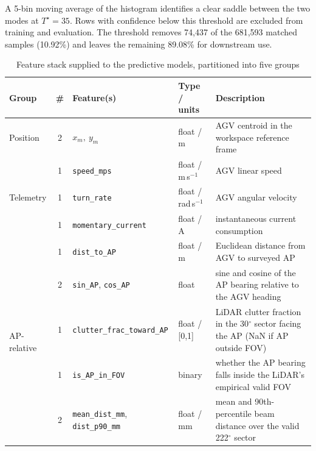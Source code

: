 \documentclass[conference]{IEEEtran}
\begin{document}
A 5-bin moving average of the histogram identifies a clear saddle between the two modes at $T^{\star} = 35$. Rows with confidence below this threshold are excluded from training and evaluation. The threshold removes 74{,}437 of the 681{,}593 matched samples (10.92\%) and leaves the remaining 89.08\% for downstream use.

\begin{table}[!t]
    \caption{Feature stack supplied to the predictive models, partitioned
    into five groups}
    \label{tab:features}
    \centering
    \setlength{\tabcolsep}{5pt}
    \footnotesize
    \begin{tabular}{l c p{} l p{}}
        \toprule
        Group & \# & Feature(s) & Type / units & Description \\
        \midrule
        Position             & 2  & $x_m,\ y_m$                              & float / m         & AGV centroid in the workspace reference frame \\
        \midrule
        \multirow{3}{*}{Telemetry} & 1 & \texttt{speed\_mps}              & float / m\,s$^{-1}$  & AGV linear speed \\
                             & 1  & \texttt{turn\_rate}                       & float / rad\,s$^{-1}$ & AGV angular velocity \\
                             & 1  & \texttt{momentary\_current}               & float / A        & instantaneous current consumption \\
        \midrule
        \multirow{5}{*}{AP-relative} & 1 & \texttt{dist\_to\_AP}            & float / m        & Euclidean distance from AGV to surveyed AP \\
                             & 2  & \texttt{sin\_AP}, \texttt{cos\_AP}        & float            & sine and cosine of the AP bearing relative to the AGV heading \\
                             & 1  & \texttt{clutter\_frac\_toward\_AP}        & float / [0,1]    & LiDAR clutter fraction in the 30$^{\circ}$ sector facing the AP (NaN if AP outside FOV) \\
                             & 1  & \texttt{is\_AP\_in\_FOV}                  & binary           & whether the AP bearing falls inside the LiDAR's empirical valid FOV \\
        \midrule
        \multirow{3}{*}{LiDAR scalar} & 2 & \texttt{mean\_dist\_mm}, \texttt{dist\_p90\_mm} & float / mm   & mean and 90th-percentile beam distance over the valid 222$^{\circ}$ sector \\

\end{tabular}
\end{table}
\end{document}
